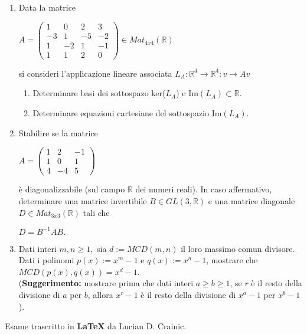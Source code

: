 \documentclass[fleqn]{article}
\begin{document}
\begin{enumerate}
   \item Data la matrice 
   \begin{center}
   $A = \begin{pmatrix}
         1 & 0 & 2 & 3 \\
         -3 & 1 & -5 & -2 \\
         1 & -2 & 1 & -1 \\
         1 & 1 & 2 & 0
      \end{pmatrix}
      \in Mat_{4x4}(\mathbb{R})$
   \end{center}
   si consideri l'applicazione lineare associata $L_A:\mathbb{R}^4 \rightarrow \mathbb{R}^4:v \rightarrow Av$
   \begin{enumerate}
      \item Determinare basi dei sottospazo ker($L_A$) e Im$(L_A)\subset \mathbb{R}$.
      \item Determinare equazioni cartesiane del sottospazio Im$(L_A)$.
   \end{enumerate}

   \item Stabilire se la matrice
   \begin{center}
      $
      A = \begin{pmatrix}
         1 & 2 & -1 \\
         1 & 0 & 1 \\
         4 & -4 & 5
      \end{pmatrix}
   $
   \end{center}
   è diagonalizzabile (sul campo $\mathbb{R}$ dei numeri reali). In caso affermativo, determinare una matrice invertibile
    $B \in GL(3,\mathbb{R})$ e una matrice diagonale $D \in Mat_{3x3}(\mathbb{R})$ tali che  

   \begin{center}
      $D= B^{-1}AB.$
   \end{center}
   
   \item Dati interi $m,n \geq 1,$ sia $d := MCD(m,n)$ il loro massimo comun divisore. Dati i polinomi $p(x) := x^m-1$
   e $q(x) := x^n-1$, mostrare che  $MCD(p(x),q(x)) = x^d-1$. \\
   (\textbf{Suggerimento:} mostrare prima che dati interi 
   $a \geq b \geq 1$, se $r$ è il resto della divisione di $a$ per $b$, allora $x^r-1$ è il resto della divisione
   di $x^a-1$ per $x^b-1$).
\end{enumerate}
Esame trascritto in \textbf{\LaTeX} da Lucian D. Crainic.
\end{document}
